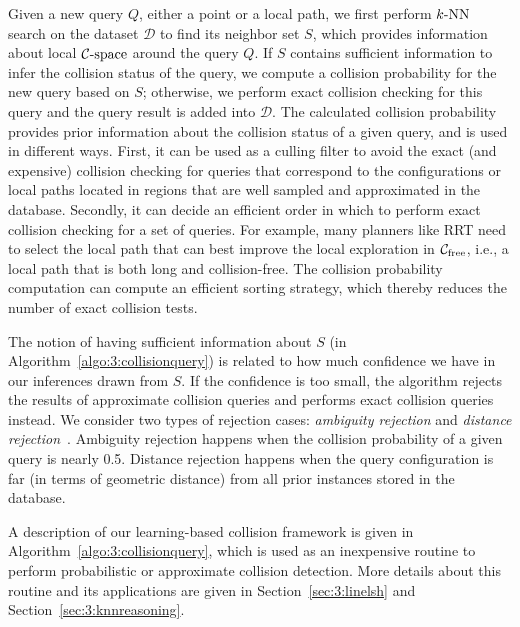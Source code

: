 Given a new query $Q$, either a point or a local path, we first perform $k\text{-NN}$ search on the dataset $\mathcal D$ to find its neighbor set $S$, which provides information about local $\mathcal C\text{-space}$ around the query $Q$. If $S$ contains sufficient information to infer the collision status of the query, we compute a collision probability for the new query based on $S$; otherwise, we perform exact collision checking for this query and the query result is added into $\mathcal D$. The calculated collision probability provides prior information about the collision status of a given query, and is used in different ways. First, it can be used as a culling filter to avoid the exact (and expensive) collision checking for queries that correspond to the configurations or local paths located in regions that are well sampled and approximated in the database. Secondly, it can decide an efficient order in which to perform exact collision checking for a set of queries. For example, many planners like RRT need to select the local path that can best improve the local exploration in $\mathcal C_{\text{free}}$, i.e., a local path that is both long and collision-free. The collision probability computation can compute an efficient sorting strategy, which thereby reduces the number of exact collision tests.

The notion of having sufficient information about $S$ (in Algorithm~\ref{algo:3:collisionquery}) is related to how much confidence we have in our inferences drawn from $S$. If the confidence is too small, the algorithm rejects the results of approximate collision queries and performs exact collision queries instead.
We consider two types of rejection cases: \emph{ambiguity rejection} and \emph{distance rejection}~\cite{Dubuisson:1993:PR}. Ambiguity rejection happens when the collision probability of a given query is nearly 0.5. Distance rejection happens when the query configuration is far (in terms of geometric distance) from all prior instances stored in the database.

A description of our learning-based collision framework is given in Algorithm~\ref{algo:3:collisionquery}, which is used as an inexpensive routine to perform probabilistic or approximate collision detection. More details about this routine and its applications are given in Section~\ref{sec:3:linelsh} and Section~\ref{sec:3:knnreasoning}.




